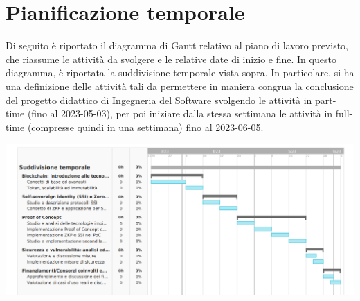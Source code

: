 \section*{Pianificazione temporale}
Di seguito è riportato il diagramma di Gantt relativo al piano di lavoro previsto, che riassume le attività da svolgere e le relative date di inizio e fine.
In questo diagramma, è riportata la suddivisione temporale vista sopra.
In particolare, si ha una definizione delle attività tali da permettere in maniera congrua la conclusione
del progetto didattico di Ingegneria del Software svolgendo le attività in part-time (fino al 2023-05-03), 
per poi iniziare dalla stessa settimana le attività in full-time (compresse quindi in una settimana) fino al 2023-06-05.
\begin{center}
	\includegraphics[width=18cm]{img/gantt.png}
\end{center}